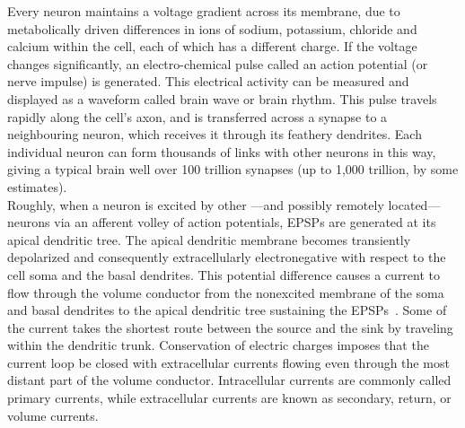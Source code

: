 Every neuron maintains a voltage gradient across its membrane, due to metabolically driven differences in ions of sodium, potassium, chloride and calcium within the cell, each of which has a different charge. If the voltage changes significantly, an electro-chemical pulse called an action potential (or nerve impulse) is generated. This electrical activity can be measured and displayed as a waveform called brain wave or brain rhythm. This pulse travels rapidly along the cell's axon, and is transferred across a synapse to a neighbouring neuron, which receives it through its feathery dendrites. Each individual neuron can form thousands of links with other neurons in this way, giving a typical brain well over 100 trillion synapses (up to 1,000 trillion, by some estimates).\\

Roughly, when a neuron is excited by other —and possibly remotely located— neurons via an afferent volley of action potentials, \ac{EPSP}s are generated at its apical dendritic tree. The apical dendritic membrane becomes transiently depolarized and consequently extracellularly electronegative with respect to the cell soma and the basal dendrites. This potential difference causes a current to flow through the volume conductor from the nonexcited membrane of the soma and basal dendrites to the apical dendritic tree sustaining the EPSPs~\cite{gloor1985neuronal}.
Some of the current takes the shortest route between the source and the sink by traveling within the dendritic trunk. Conservation of electric charges imposes that the current loop be closed with extracellular currents flowing even through the most distant part of the volume conductor. Intracellular currents are commonly called primary currents, while extracellular currents are known as secondary, return, or volume currents.\\

